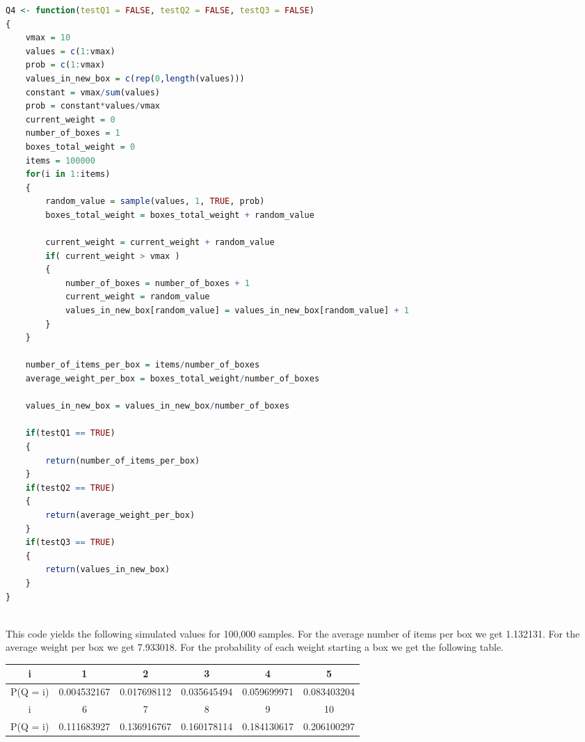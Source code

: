 \documentclass[10pt,a4paper]{article}
\begin{document}
\begin{lstlisting}[language = R]
Q4 <- function(testQ1 = FALSE, testQ2 = FALSE, testQ3 = FALSE)
{
    vmax = 10
    values = c(1:vmax)
    prob = c(1:vmax)
    values_in_new_box = c(rep(0,length(values)))
    constant = vmax/sum(values)
    prob = constant*values/vmax
    current_weight = 0
    number_of_boxes = 1
    boxes_total_weight = 0
    items = 100000
    for(i in 1:items)
    {
        random_value = sample(values, 1, TRUE, prob)
        boxes_total_weight = boxes_total_weight + random_value
       
        current_weight = current_weight + random_value
        if( current_weight > vmax )
        {
            number_of_boxes = number_of_boxes + 1
            current_weight = random_value
            values_in_new_box[random_value] = values_in_new_box[random_value] + 1
        }
    }
   
    number_of_items_per_box = items/number_of_boxes
    average_weight_per_box = boxes_total_weight/number_of_boxes
   
    values_in_new_box = values_in_new_box/number_of_boxes
   
    if(testQ1 == TRUE)
    {
        return(number_of_items_per_box)
    }
    if(testQ2 == TRUE)
    {
        return(average_weight_per_box)
    }
    if(testQ3 == TRUE)
    {
        return(values_in_new_box)
    }
}
 
\end{lstlisting}
 
This code yields the following simulated values for 100,000 samples. For the average number of items per box we get 1.132131. For the average weight per box we get 7.933018. For the probability of each weight starting a box we get the following table.
\begin{center}
\begin{tabu}{ |c|c|c|c|c|c| }
    \hline
    i & 1 & 2 & 3 & 4 & 5 \\
    \hline
    P(Q = i) & 0.004532167 & 0.017698112 & 0.035645494 & 0.059699971 & 0.083403204   \\
    \hline
    i & 6 & 7 & 8 & 9 & 10\\
    \hline
    P(Q = i) & 0.111683927 & 0.136916767 & 0.160178114 & 0.184130617 & 0.206100297 \\
    \hline
\end{tabu}
\end{center}
 
\end{document}
